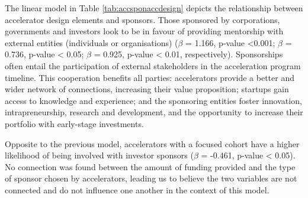\documentclass[
  12pt,
]{article}
\begin{document}

The linear model in Table \ref{tab:accsponaccdesign} depicts the relationship between accelerator design elements and sponsors. Those sponsored by corporations, governments and investors look to be in favour of providing mentorship with external entities (individuals or organisations) (\(\beta\) = 1.166, p-value \textless0.001; \(\beta\) = 0.736, p-value \textless{} 0.05; \(\beta\) = 0.925, p-value \textless{} 0.01, respectively). Sponsorships often entail the participation of external stakeholders in the acceleration program timeline. This cooperation benefits all parties: accelerators provide a better and wider network of connections, increasing their value proposition; startups gain access to knowledge and experience; and the sponsoring entities foster innovation, intrapreneurship, research and development, and the opportunity to increase their portfolio with early-stage investments.

Opposite to the previous model, accelerators with a focused cohort have a higher likelihood of being involved with investor sponsors (\(\beta\) = -0.461, p-value \textless{} 0.05). No connection was found between the amount of funding provided and the type of sponsor chosen by accelerators, leading us to believe the two variables are not connected and do not influence one another in the context of this model.

\onehalfspacing
\end{document}
